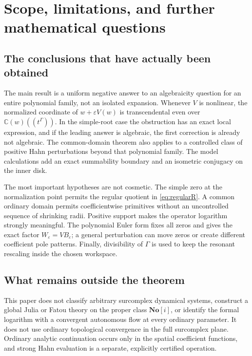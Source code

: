 \documentclass[11pt,a4paper]{article}
\numberwithin{equation}{section}
\theoremstyle{definition}
\theoremstyle{remark}
\newcommand{\C}{\mathbb C}
\newcommand{\No}{\mathbf{No}}
\newcommand{\eps}{\varepsilon}
\begin{document}
\section{Scope, limitations, and further mathematical questions}
\label{sec:limits}

\subsection{The conclusions that have actually been obtained}

The main result is a uniform negative answer to an algebraicity question
for an entire polynomial family, not an isolated expansion.  Whenever
$V$ is nonlinear, the normalized coordinate of $w+\eps V(w)$ is
transcendental even over $\C(w)((t^\Gamma))$.  In the simple-root case the
obstruction has an exact local expression, and if the leading answer is
algebraic, the first correction is already not algebraic.
The common-domain theorem also applies to a controlled class of positive
Hahn perturbations beyond that polynomial family.  The model calculations
add an exact summability boundary and an isometric conjugacy on the inner
disk.

The most important hypotheses are not cosmetic.  The simple zero at the
normalization point permits the regular quotient in
\eqref{eq:regularR}.  A common ordinary domain permits coefficientwise
primitives without an uncontrolled sequence of shrinking radii.  Positive
support makes the operator logarithm strongly meaningful.  The polynomial
Euler form fixes all zeros and gives the exact factor $W_\eps=V B_\eps$;
a general perturbation can move zeros or create different coefficient pole
patterns.  Finally, divisibility of $\Gamma$ is used to keep the resonant
rescaling inside the chosen workspace.

\subsection{What remains outside the theorem}

This paper does not classify arbitrary surcomplex dynamical systems,
construct a global Julia or Fatou theory on the proper class $\No[i]$, or
identify the formal logarithm with a convergent autonomous flow at every
ordinary parameter.  It does not use ordinary topological convergence in
the full surcomplex plane.  Ordinary analytic continuation occurs only in
the spatial coefficient functions, and strong Hahn evaluation is a
separate, explicitly certified operation.
\end{document}
